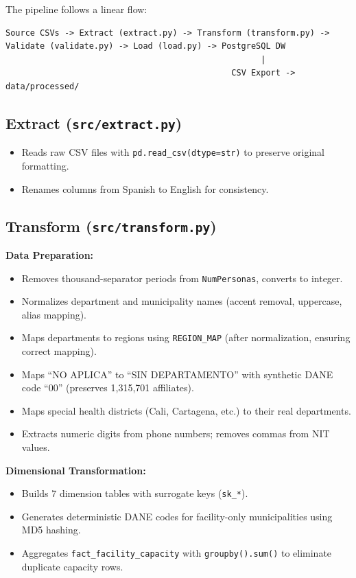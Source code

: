 \documentclass[12pt,a4paper]{article}
\begin{document}
The pipeline follows a linear flow:

\begin{lstlisting}
Source CSVs -> Extract (extract.py) -> Transform (transform.py) ->
Validate (validate.py) -> Load (load.py) -> PostgreSQL DW
                                                    |
                                              CSV Export -> data/processed/
\end{lstlisting}

\subsection{Extract (\texttt{src/extract.py})}

\begin{itemize}[nosep]
    \item Reads raw CSV files with \texttt{pd.read\_csv(dtype=str)} to preserve original formatting.
    \item Renames columns from Spanish to English for consistency.
\end{itemize}

\subsection{Transform (\texttt{src/transform.py})}

\textbf{Data Preparation:}
\begin{itemize}[nosep]
    \item Removes thousand-separator periods from \texttt{NumPersonas}, converts to integer.
    \item Normalizes department and municipality names (accent removal, uppercase, alias mapping).
    \item Maps departments to regions using \texttt{REGION\_MAP} (after normalization, ensuring correct mapping).
    \item Maps ``NO APLICA'' to ``SIN DEPARTAMENTO'' with synthetic DANE code ``00'' (preserves 1,315,701 affiliates).
    \item Maps special health districts (Cali, Cartagena, etc.) to their real departments.
    \item Extracts numeric digits from phone numbers; removes commas from NIT values.
\end{itemize}

\textbf{Dimensional Transformation:}
\begin{itemize}[nosep]
    \item Builds 7 dimension tables with surrogate keys (\texttt{sk\_*}).
    \item Generates deterministic DANE codes for facility-only municipalities using MD5 hashing.
    \item Aggregates \texttt{fact\_facility\_capacity} with \texttt{groupby().sum()} to eliminate duplicate capacity rows.
\end{itemize}
\end{document}
